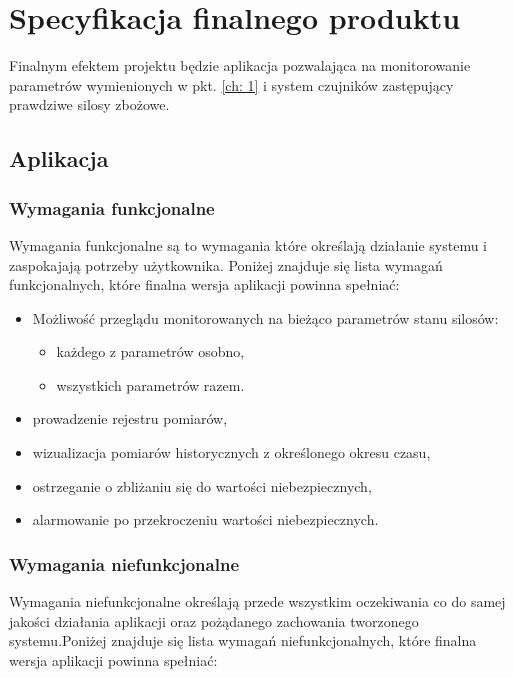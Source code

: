 \section{Specyfikacja finalnego produktu}
    Finalnym efektem projektu będzie aplikacja pozwalająca na monitorowanie parametrów
    wymienionych w pkt. \ref{ch: 1} i system czujników zastępujący prawdziwe silosy zbożowe.
    \subsection{Aplikacja} 
        \subsubsection{Wymagania funkcjonalne}
            Wymagania funkcjonalne są to wymagania które określają działanie systemu i zaspokajają potrzeby użytkownika.
            Poniżej znajduje się lista wymagań funkcjonalnych, które finalna wersja aplikacji powinna spełniać:
            \begin{itemize}
                \item Możliwość przeglądu monitorowanych na bieżąco parametrów stanu silosów:
                \begin{itemize}
                    \item każdego z parametrów osobno,
                    \item wszystkich parametrów razem.
                \end{itemize}
                \item prowadzenie rejestru pomiarów,
                \item wizualizacja pomiarów historycznych z określonego okresu czasu,
                \item ostrzeganie o zbliżaniu się do wartości niebezpiecznych,
                \item alarmowanie po przekroczeniu wartości niebezpiecznych.
            \end{itemize}
        \subsubsection{Wymagania niefunkcjonalne}
        Wymagania niefunkcjonalne określają przede wszystkim oczekiwania co do samej jakości działania 
        aplikacji oraz pożądanego zachowania tworzonego systemu.Poniżej znajduje się lista wymagań 
        niefunkcjonalnych, które finalna wersja aplikacji powinna spełniać:

